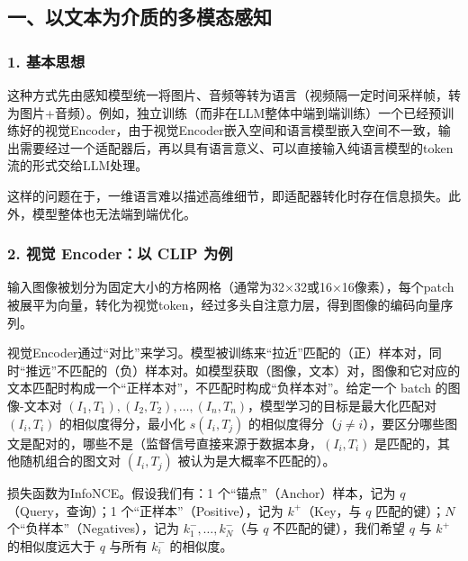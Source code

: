 \hypertarget{ux4e00ux4ee5ux6587ux672cux4e3aux4ecbux8d28ux7684ux591aux6a21ux6001ux611fux77e5}{%
\subsection{一、以文本为介质的多模态感知}\label{ux4e00ux4ee5ux6587ux672cux4e3aux4ecbux8d28ux7684ux591aux6a21ux6001ux611fux77e5}}

\hypertarget{ux57faux672cux601dux60f3}{%
\subsubsection{1. 基本思想}\label{ux57faux672cux601dux60f3}}

这种方式先由感知模型统一将图片、音频等转为语言（视频隔一定时间采样帧，转为图片+音频）。例如，独立训练（而非在LLM整体中端到端训练）一个已经预训练好的视觉Encoder，由于视觉Encoder嵌入空间和语言模型嵌入空间不一致，输出需要经过一个适配器后，再以具有语言意义、可以直接输入纯语言模型的token流的形式交给LLM处理。

这样的问题在于，一维语言难以描述高维细节，即适配器转化时存在信息损失。此外，模型整体也无法端到端优化。

\hypertarget{ux89c6ux89c9-encoderux4ee5-clip-ux4e3aux4f8b}{%
\subsubsection{2. 视觉 Encoder：以 CLIP 为例}\label{ux89c6ux89c9-encoderux4ee5-clip-ux4e3aux4f8b}}

输入图像被划分为固定大小的方格网格（通常为32×32或16×16像素），每个patch被展平为向量，转化为视觉token，经过多头自注意力层，得到图像的编码向量序列。

视觉Encoder通过``对比''来学习。模型被训练来``拉近''匹配的（正）样本对，同时``推远''不匹配的（负）样本对。如模型获取（图像，文本）对，图像和它对应的文本匹配时构成一个``正样本对''，不匹配时构成``负样本对''。给定一个 batch 的图像-文本对 \((I_1,T_1),(I_2,T_2),\ldots,(I_n,T_n)\)，模型学习的目标是最大化匹配对 \((I_i,T_i)\) 的相似度得分，最小化 \(s(I_i,T_j)\) 的相似度得分（\(j\ne i\)），要区分哪些图文是配对的，哪些不是（监督信号直接来源于数据本身，\((I_i,T_i)\) 是匹配的，其他随机组合的图文对 \((I_i,T_j)\) 被认为是大概率不匹配的）。

损失函数为InfoNCE。假设我们有：1 个``锚点''（Anchor）样本，记为 \(q\)（Query，查询）；1 个``正样本''（Positive），记为 \(k^+\)（Key，与 \(q\) 匹配的键）；\(N\) 个``负样本''（Negatives），记为 \(k_1^-,\ldots,k_N^-\)（与 \(q\) 不匹配的键），我们希望 \(q\) 与 \(k^+\) 的相似度远大于 \(q\) 与所有 \(k_i^-\) 的相似度。

